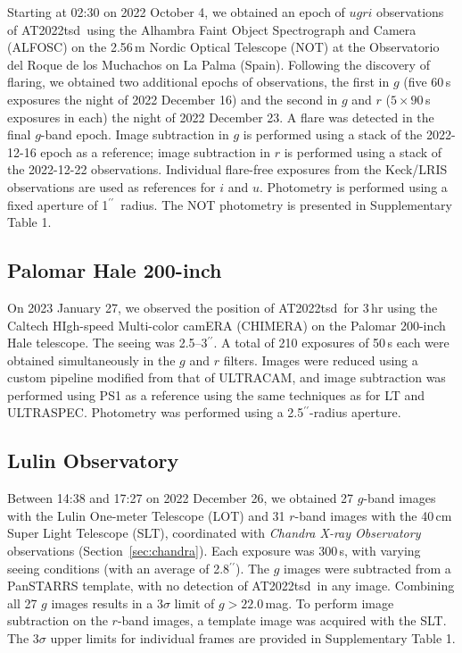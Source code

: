 \documentclass{nature_plusfigure}
\newcommand{\at}{AT2022tsd}
\newcommand{\arcsec}{$^{\prime\prime}$}
\begin{document}
\begin{methods}
Starting at 02:30 on 2022 October 4, we obtained an epoch of $ugri$ observations of \at\ using the Alhambra Faint Object Spectrograph and Camera (ALFOSC) on the 2.56\,m Nordic Optical Telescope (NOT) at the Observatorio del Roque de los Muchachos on La Palma (Spain). Following the discovery of flaring, we obtained two additional epochs of observations, the first in $g$ (five 60\,s exposures the night of 2022 December 16) and the second in $g$ and $r$ ($5 \times 90$\,s exposures in each) the night of 2022 December 23. A flare was detected in the final $g$-band epoch.  Image subtraction in $g$ is performed using a stack of the 2022-12-16 epoch as a reference; image subtraction in $r$ is performed using a stack of the 2022-12-22 observations.  Individual flare-free exposures from the Keck/LRIS observations are used as references for $i$ and $u$.  Photometry is performed using a fixed aperture of 1\arcsec\ radius.
The NOT photometry is presented in Supplementary Table 1.

\subsection{Palomar Hale 200-inch}
\label{sec:chimera}

On 2023 January 27, we observed the position of \at\ for 3\,hr using the Caltech HIgh-speed Multi-color camERA (CHIMERA\cite{Harding2016}) on the Palomar 200-inch Hale telescope. The seeing was 2.5--3\arcsec.
A total of 210 exposures of 50\,s each were obtained simultaneously in the $g$ and $r$ filters. Images were reduced using a custom pipeline modified from that of ULTRACAM\cite{Dhillon2007}, and image subtraction was performed using PS1 as a reference using the same techniques as for LT and ULTRASPEC. Photometry was performed using a 2.5\arcsec-radius aperture.

\subsection{Lulin Observatory}
\label{sec:lulin}

Between 14:38 and 17:27 on 2022 December 26, we obtained 
27 $g$-band images with the Lulin One-meter Telescope (LOT) and 31 $r$-band images with the 40\,cm Super Light Telescope (SLT), coordinated with {\it Chandra X-ray Observatory} observations (Section~\ref{sec:chandra}). Each exposure was 300\,s, with varying seeing conditions (with an average of 2.8\arcsec). The $g$ images were subtracted from a PanSTARRS template, with no detection of \at\ in any image.
Combining all 27 $g$ images results in a 3$\sigma$ limit of $g>22.0$\,mag.
To perform image subtraction on the $r$-band images, a template image was acquired with the SLT.
The 3$\sigma$ upper limits for individual frames are provided in Supplementary Table 1.


\end{methods}
\end{document}

